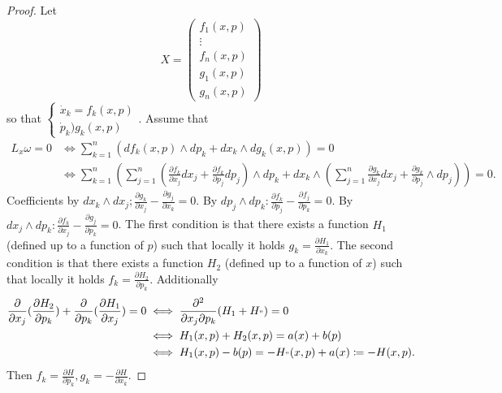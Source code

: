 \documentclass[hidelinks,a4paper, 11pt]{article}
\theoremstyle{plain}
\theoremstyle{break}
\theoremstyle{plain}
\theoremstyle{definition}
\begin{document}
{\begin{proof}
	Let 
	\[
	X = \begin{pmatrix}
	f_1(x,p) \\ \vdots \\ f_n(x,p) \\ g_1(x,p) \\ g_n(x,p)
	\end{pmatrix}
	\]
	so that $\begin{cases}
	\dot x_k = f_k(x,p) \\ \dot p_k ) g_k(x,p)
	\end{cases}$. 
	Assume that
	\begin{align*}
	L_x\omega = 0 &\iff \sum_{k=1}^n (df_k(x,p) \land dp_k + dx_k \land dg_k(x,p)) = 0\\
	&\iff \sum^n_{k=1}(\sum^n_{j=1} (\frac{\partial f_k}{\partial x_j} dx_j + \frac{\partial f_k}{\partial p_j} dp_j) \land dp_k + dx_k \land 
	(\sum_{j=1}^n \frac{\partial g_k}{\partial x_j} dx_j + \frac{\partial g_k}{\partial p_j}\land dp_j) ) = 0.
	\end{align*}
	Coefficients by $dx_k \land dx_j ; \frac{\partial g_k}{\partial x_j} - \frac{\partial g_j}{\partial x_k} = 0$. By $dp_j \land dp_k: \frac{\partial f_k}{\partial p_j} - \frac{\partial f_j}{\partial p_k} = 0$. By $dx_j \land dp_k: \frac{\partial f_k}{\partial x_j} - \frac{\partial g_j}{\partial p_k} = 0$. The first condition is that there exists a function $H_1$ (defined up to a function of $p$) such that locally it holds $g_k = \frac{\partial H_1}{\partial x_k}$. The second condition is that there exists a function $H_2$ (defined up to a function of $x$) such that locally it holds $f_k = \frac{\partial H_2}{\partial p_k}$. Additionally 
	\begin{align*}
	\frac{\partial}{\partial x_j} (\frac{\partial H_2}{\partial p_k}) + \frac{\partial }{\partial p_k} (\frac{\partial H_1}{\partial x_j}) = 0 &\iff \frac{\partial^2}{\partial x_j \partial p_k} (H_1 + H_") = 0 \\
	&\iff H_1(x,p) + H_2(x,p) = a(x) + b(p) \\
	& \iff H_1(x,p) - b(p ) = -H_"(x,p) + a(x) \coloneqq -H(x,p).
	\end{align*} 
	Then $f_k = \frac{\partial H}{\partial p_k} , g_k = -\frac{\partial H}{\partial x_k}$.
\end{proof}

}
\end{document}
